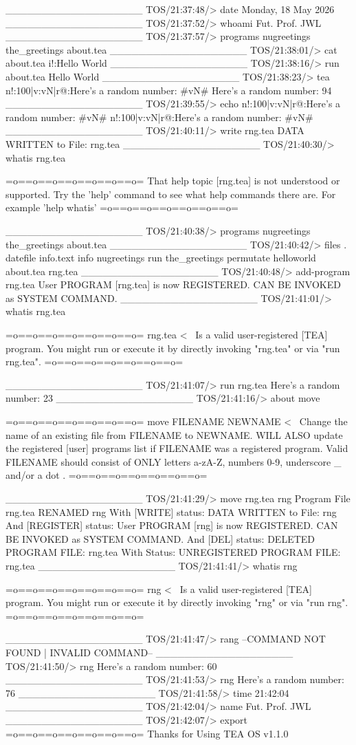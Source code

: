 \documentclass{article}
\begin{document}
\begin{tcbverbatim}[title=TEA OS v1.1.0 Work Session, breakable]
___________________
TOS/21:37:48/> 
date
Monday, 18 May 2026
___________________
TOS/21:37:52/> 
whoami
Fut. Prof. JWL
___________________
TOS/21:37:57/> 
programs
nugreetings
the_greetings
about.tea
___________________
TOS/21:38:01/> 
cat about.tea
i!:Hello World
___________________
TOS/21:38:16/> 
run about.tea
Hello World
___________________
TOS/21:38:23/> 
tea n!:100|v:vN|r@:{Here's a random number: #vN#}
Here's a random number: 94
___________________
TOS/21:39:55/> 
echo n!:100|v:vN|r@:{Here's a random number: #vN#}
n!:100|v:vN|r@:{Here's a random number: #vN#}
___________________
TOS/21:40:11/> 
write rng.tea
DATA WRITTEN to File: rng.tea
___________________
TOS/21:40:30/> 
whatis rng.tea

=o==o==o==o==o==o==o=
That help topic [rng.tea] is not understood or supported. Try the 'help' command to see what help commands there are. For example 'help whatis'
=o==o==o==o==o==o==o=

___________________
TOS/21:40:38/> 
programs
nugreetings
the_greetings
about.tea
___________________
TOS/21:40:42/> 
files
.
datefile
info.text
info
nugreetings
run
the_greetings
permutate
helloworld
about.tea
rng.tea
___________________
TOS/21:40:48/> 
add-program rng.tea
User PROGRAM [rng.tea] is now REGISTERED.
CAN BE INVOKED as SYSTEM COMMAND.
___________________
TOS/21:41:01/> 
whatis rng.tea

=o==o==o==o==o==o==o=
rng.tea <~ Is a valid user-registered [TEA] program. You might run or execute it by directly invoking "rng.tea" or via "run rng.tea".
=o==o==o==o==o==o==o=

___________________
TOS/21:41:07/> 
run rng.tea
Here's a random number: 23
___________________
TOS/21:41:16/> 
about move

=o==o==o==o==o==o==o=
move FILENAME NEWNAME <~ Change the name of an existing file from FILENAME to NEWNAME. WILL ALSO update the registered [user] programs list if FILENAME was a registered program. Valid FILENAME should consist of ONLY letters a-zA-Z, numbers 0-9, underscore _ and/or a dot .
=o==o==o==o==o==o==o=

___________________
TOS/21:41:29/> 
move rng.tea rng
Program File rng.tea RENAMED  rng
With [WRITE] status: DATA WRITTEN to File: rng
And [REGISTER] status: User PROGRAM [rng] is now REGISTERED.
CAN BE INVOKED as SYSTEM COMMAND.
And [DEL] status: DELETED PROGRAM FILE: rng.tea
With Status: UNREGISTERED PROGRAM FILE: rng.tea
___________________
TOS/21:41:41/> 
whatis rng

=o==o==o==o==o==o==o=
rng <~ Is a valid user-registered [TEA] program. You might run or execute it by directly invoking "rng" or via "run rng".
=o==o==o==o==o==o==o=

___________________
TOS/21:41:47/> 
rang
--COMMAND NOT FOUND | INVALID COMMAND--
___________________
TOS/21:41:50/> 
rng
Here's a random number: 60
___________________
TOS/21:41:53/> 
rng
Here's a random number: 76
___________________
TOS/21:41:58/> 
time
21:42:04
___________________
TOS/21:42:04/> 
name
Fut. Prof. JWL
___________________
TOS/21:42:07/> 
export
=o==o==o==o==o==o==o=
Thanks for Using TEA OS v1.1.0
  \end{tcbverbatim}
\end{document}
